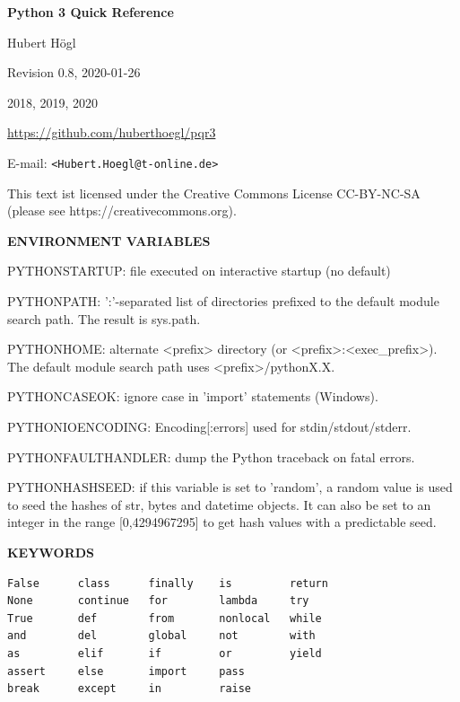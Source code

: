 \documentclass[9pt,a4wide]{extarticle}
\begin{document}
\begin{center}
{\LARGE\bf
     Python 3 Quick Reference\\
}
           \bigskip

           Hubert Högl

      Revision 0.8, 2020-01-26 
      
        2018, 2019, 2020

 \url{https://github.com/huberthoegl/pqr3}
      
\end{center}

\vskip 1cm

\newcommand{\rval}{$\rightarrow$\ }

\setlength{\columnsep}{2cm}
\begin{multicols}{2}
  \tableofcontents
\end{multicols}

\vfill

E-mail: {\tt <Hubert.Hoegl@t-online.de>}

This text ist licensed under the Creative Commons License CC-BY-NC-SA (please
see https://creativecommons.org).

\newpage

{\LARGE\bf ENVIRONMENT VARIABLES}

PYTHONSTARTUP: file executed on interactive startup (no default)

PYTHONPATH: ':'-separated list of directories prefixed to the
 default module search path.  The result is sys.path.

PYTHONHOME: alternate <prefix> directory (or <prefix>:<exec\_prefix>).
 The default module search path uses <prefix>/pythonX.X.

PYTHONCASEOK: ignore case in 'import' statements (Windows).

PYTHONIOENCODING: Encoding[:errors] used for stdin/stdout/stderr.

PYTHONFAULTHANDLER: dump the Python traceback on fatal errors.

PYTHONHASHSEED: if this variable is set to
'random', a random value is used to seed the
hashes of str, bytes and datetime objects.  It
can also be set to an integer in the range
[0,4294967295] to get hash values with a
predictable seed.


\bigskip
{\LARGE\bf KEYWORDS}

\begin{verbatim}
False      class      finally    is         return
None       continue   for        lambda     try
True       def        from       nonlocal   while
and        del        global     not        with
as         elif       if         or         yield
assert     else       import     pass
break      except     in         raise
\end{verbatim}
\end{document}
